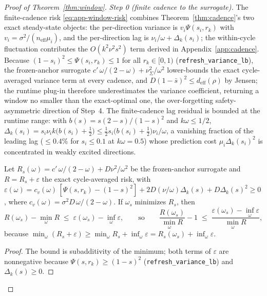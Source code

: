 \begin{proof}[Proof of Theorem~\ref{thm:window}]
\emph{Step 0 (finite cadence to the surrogate).}
The finite-cadence risk \eqref{eq:app-window-risk} combines Theorem~\ref{thm:cadence}'s two exact steady-state objects: the per-direction variance is $v_i\Psi(s_i,r_k)$ with $v_i=\sigma^2/(n_{\mathrm{eff}}\mu_i)$, and the per-direction lag is $\nu_i/\omega+\Delta_k(s_i)$; the within-cycle fluctuation contributes the $O(k^2\nu^2s^2)$ term derived in Appendix~\ref{app:cadence}.
Because $(1-s_i)^2 \le \Psi(s_i,r_k) \le 1$ for all $r_k \in [0,1)$ (\texttt{refresh\_variance\_lb}), the frozen-anchor surrogate $c'\,\omega/(2-\omega)+\nu^2_\Sigma/\omega^2$ lower-bounds the exact cycle-averaged variance term at every cadence, and $D(1-\bar s)^2 \le d_{\mathrm{eff}}(\rho)$ by Jensen; the runtime plug-in therefore underestimates the variance coefficient, returning a window no smaller than the exact-optimal one, the over-forgetting safety-asymmetric direction of Step~4.
The finite-cadence lag residual is bounded at the runtime range: with $b(s)=s(2-s)/(1-s)^2$ and $k\omega \le 1/2$, $\Delta_k(s_i)=s_i\nu_i k\bigl(b(s_i)+\tfrac12\bigr)\le \tfrac12 s_i\bigl(b(s_i)+\tfrac12\bigr)\nu_i/\omega$, a vanishing fraction of the leading lag ($\le 0.4\%$ for $s_i\le 0.1$ at $k\omega=0.5$) whose prediction cost $\mu_i\Delta_k(s_i)^2$ is concentrated in weakly excited directions.
\begin{proposition}
\label{prop:gap}
Let $R_s(\omega) = c'\,\omega/(2-\omega) + D\nu^2/\omega^2$ be the frozen-anchor surrogate and $R = R_s + \varepsilon$ the exact cycle-averaged risk, with
$\varepsilon(\omega) = c_v(\omega)\,[\Psi(s,r_k)-(1-s)^2] + 2D(\nu/\omega)\Delta_k(s) + D\Delta_k(s)^2 \ge 0$, where $c_v(\omega) = \sigma^2 D\,\omega/(2-\omega)$.
If $\omega_s$ minimizes $R_s$, then
\[
R(\omega_s) - \min_\omega R \;\le\; \varepsilon(\omega_s) - \inf_\omega \varepsilon,
\qquad\text{so}\qquad
\frac{R(\omega_s)}{\min_\omega R} - 1 \;\le\; \frac{\varepsilon(\omega_s) - \inf_\omega \varepsilon}{\min_\omega R},
\]
because $\min_\omega(R_s + \varepsilon) \ge \min_\omega R_s + \inf_\omega \varepsilon = R_s(\omega_s) + \inf_\omega\varepsilon$.
\end{proposition}
\begin{proof}
The bound is subadditivity of the minimum; both terms of $\varepsilon$ are nonnegative because $\Psi(s,r_k) \ge (1-s)^2$ (\texttt{refresh\_variance\_lb}) and $\Delta_k(s) \ge 0$.
\end{proof}


\end{proof}
